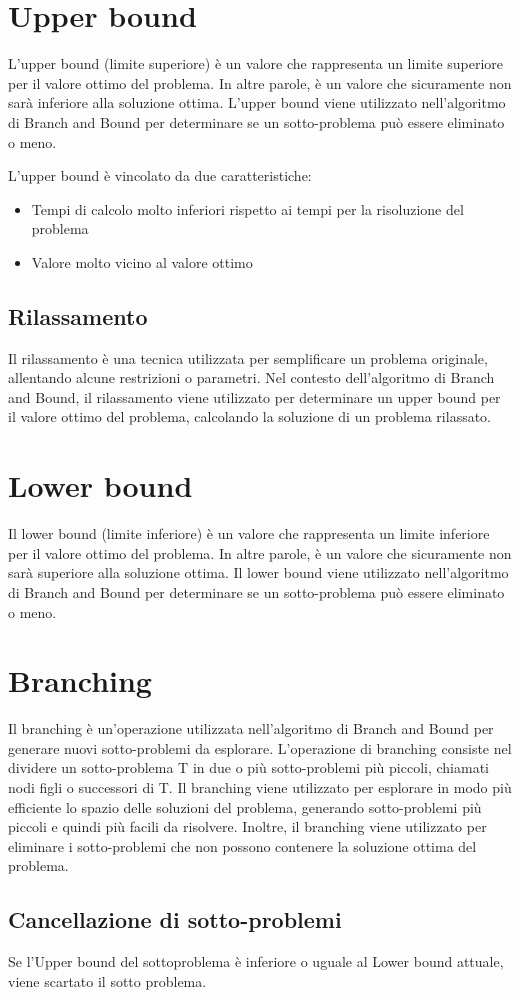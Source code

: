 \section{Upper bound}
L'upper bound (limite superiore) è un valore che rappresenta un limite superiore per il valore ottimo del problema. In altre parole, è un valore che sicuramente non sarà inferiore alla soluzione ottima. L'upper bound viene utilizzato nell'algoritmo di Branch and Bound per determinare se un sotto-problema può essere eliminato o meno.

L'upper bound \`e vincolato da due caratteristiche:
\begin{itemize}
  \item Tempi di calcolo molto inferiori rispetto ai tempi per la risoluzione del problema
  \item Valore molto vicino al valore ottimo
\end{itemize} 


\subsection{Rilassamento}
Il rilassamento è una tecnica utilizzata per semplificare un problema originale, allentando alcune restrizioni o parametri. Nel contesto dell'algoritmo di Branch and Bound, il rilassamento viene utilizzato per determinare un upper bound per il valore ottimo del problema, calcolando la soluzione di un problema rilassato.



\section{Lower bound}

Il lower bound (limite inferiore) è un valore che rappresenta un limite inferiore per il valore ottimo del problema. In altre parole, è un valore che sicuramente non sarà superiore alla soluzione ottima. Il lower bound viene utilizzato nell'algoritmo di Branch and Bound per determinare se un sotto-problema può essere eliminato o meno.


\section{Branching}
Il branching è un'operazione utilizzata nell'algoritmo di Branch and Bound per generare nuovi sotto-problemi da esplorare. L'operazione di branching consiste nel dividere un sotto-problema T in due o più sotto-problemi più piccoli, chiamati nodi figli o successori di T.
Il branching viene utilizzato per esplorare in modo più efficiente lo spazio delle soluzioni del problema, generando sotto-problemi più piccoli e quindi più facili da risolvere. Inoltre, il branching viene utilizzato per eliminare i sotto-problemi che non possono contenere la soluzione ottima del problema.

\subsection{Cancellazione di sotto-problemi}

Se l'Upper bound del sottoproblema \`e inferiore o uguale al Lower bound attuale, viene scartato il sotto problema.


